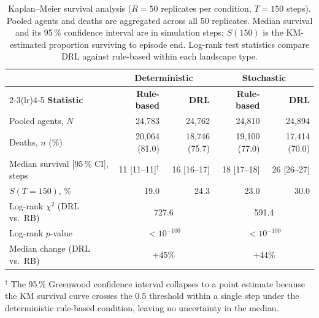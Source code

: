\documentclass[pdflatex,sn-mathphys-num]{sn-jnl}%
\theoremstyle{thmstyleone}%
\theoremstyle{thmstyletwo}%
\theoremstyle{thmstylethree}%
\begin{document}
\begin{table}[ht]
\centering
\caption{Kaplan--Meier survival analysis ($R = 50$ replicates per condition, $T = 150$ steps). Pooled agents and deaths are aggregated across all 50 replicates. Median survival and its 95\,\% confidence interval are in simulation steps; $S(150)$ is the KM-estimated proportion surviving to episode end. Log-rank test statistics compare DRL against rule-based within each landscape type.}
\label{tab:km_survival}
\begin{tabular}{lrrrr}
\toprule
 & \multicolumn{2}{c}{\textbf{Deterministic}} & \multicolumn{2}{c}{\textbf{Stochastic}} \\
\cmidrule(lr){2-3}\cmidrule(lr){4-5}
\textbf{Statistic} & \textbf{Rule-based} & \textbf{DRL} & \textbf{Rule-based} & \textbf{DRL} \\
\midrule
Pooled agents, $N$                 & 24{,}783           & 24{,}762           & 24{,}810           & 24{,}894           \\
Deaths, $n$ (\%)                   & 20{,}064 (81.0)    & 18{,}746 (75.7)    & 19{,}100 (77.0)    & 17{,}414 (70.0)    \\
Median survival [95\,\% CI], steps & 11 [11--11]$^{\dagger}$ & 16 [16--17]        & 18 [17--18]        & 26 [26--27]        \\
$S(T\!=\!150)$, \%                 & 19.0               & 24.3               & 23.0               & 30.0               \\
\midrule
Log-rank $\chi^{2}$ (DRL vs.\ RB) & \multicolumn{2}{c}{727.6}              & \multicolumn{2}{c}{591.4}              \\
Log-rank $p$-value                 & \multicolumn{2}{c}{$<\!10^{-100}$}    & \multicolumn{2}{c}{$<\!10^{-100}$}    \\
Median change (DRL vs.\ RB)        & \multicolumn{2}{c}{$+45\%$}           & \multicolumn{2}{c}{$+44\%$}           \\
\bottomrule
\end{tabular}
\smallskip

\noindent\footnotesize{$^{\dagger}$ The 95\,\% Greenwood confidence interval collapses to a point estimate because the KM survival curve crosses the 0.5 threshold within a single step under the deterministic rule-based condition, leaving no uncertainty in the median.}
\end{table}
\end{document}
